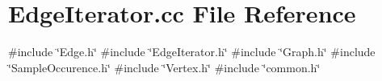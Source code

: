 \section{Edge\+Iterator.\+cc File Reference}
\label{EdgeIterator_8cc}
{\ttfamily \#include \char`\"{}Edge.\+h\char`\"{}}\newline
{\ttfamily \#include \char`\"{}Edge\+Iterator.\+h\char`\"{}}\newline
{\ttfamily \#include \char`\"{}Graph.\+h\char`\"{}}\newline
{\ttfamily \#include \char`\"{}Sample\+Occurence.\+h\char`\"{}}\newline
{\ttfamily \#include \char`\"{}Vertex.\+h\char`\"{}}\newline
{\ttfamily \#include \char`\"{}common.\+h\char`\"{}}\newline
